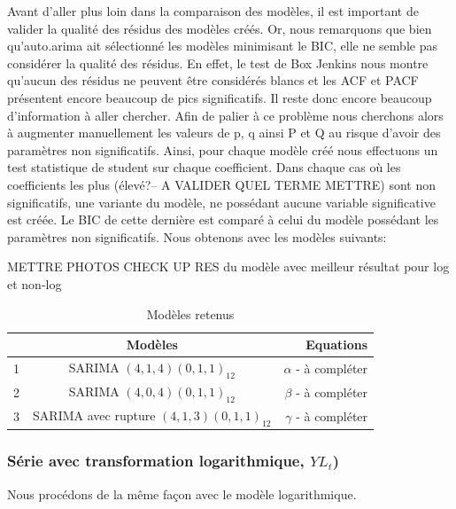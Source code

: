 \documentclass[12pt,a4paper]{book}
\newcommand{\1}{\mathds{1}}
\begin{document}
Avant d'aller plus loin dans la comparaison des modèles, il est important de valider la qualité des résidus des modèles créés. Or, nous remarquons que bien qu'auto.arima ait sélectionné les modèles minimisant le BIC, elle ne semble pas considérer la qualité des résidus. En effet, le test de Box Jenkins nous montre qu'aucun des résidus ne peuvent être considérés blancs et les ACF et PACF présentent encore beaucoup de pics significatifs. Il reste donc encore beaucoup d'information à aller chercher. Afin de palier à ce problème nous cherchons alors à augmenter manuellement les valeurs de p, q ainsi P et Q au risque d'avoir des paramètres non significatifs. Ainsi, pour chaque modèle créé nous effectuons un test statistique de student sur chaque coefficient. Dans chaque cas où les coefficients les plus (élevé?-- A VALIDER QUEL TERME METTRE) sont non significatifs, une variante du modèle, ne possédant aucune variable significative est créée. Le BIC de cette dernière est comparé à celui du modèle possédant les paramètres non significatifs. Nous obtenons avec les modèles suivants:

METTRE PHOTOS CHECK UP RES du modèle avec meilleur résultat pour log et non-log

\begin{table}[h!]
  \begin{center}
    \caption{Modèles retenus}
    \label{tab:table1}
    \begin{tabular}{l|c|r} %
      \ & \textbf{Modèles} & \textbf{Equations}\\
      \hline
      1 & SARIMA $(4,1,4)(0,1,1)_{12}$ & $\alpha$ - à compléter\\
      2 & SARIMA $(4,0,4)(0,1,1)_{12}$& $\beta$ - à compléter\\
      3 & SARIMA avec rupture $(4,1,3)(0,1,1)_{12}$ & $\gamma$ - à compléter\\
    \end{tabular}
  \end{center}
\end{table}



\vspace{5 mm}
\subsubsection{Série avec transformation logarithmique, $YL_t$)}

Nous procédons de la même façon avec le modèle logarithmique.
\end{document}
